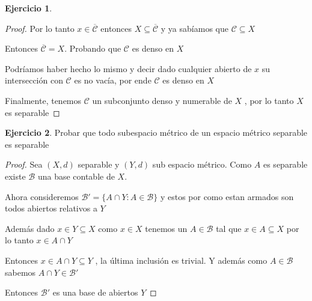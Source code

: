 \documentclass[11pt]{report}
\newcommand{\ol}{\overline}
\theoremstyle{definition}
\newtheorem{ej}{Ejercicio}
\begin{document}
\begin{ej}
\begin{proof}
		Por lo tanto $x \in \ol{\mathcal{C}}$ entonces $X \subseteq \ol{\mathcal{C}}$ y ya sabíamos que $\mathcal{C} \subseteq X$

		Entonces $\ol{\mathcal{C}} = X$. Probando que $\mathcal{C}$ es denso en $X$

		Podríamos haber hecho lo mismo y decir dado cualquier abierto de $x$ su intersección con $\mathcal{C}$ es no vacía, por ende $\mathcal{C}$ es denso en $X$

		Finalmente, tenemos $\mathcal{C}$ un subconjunto denso y numerable de $X$ , por lo tanto $X$ es separable
	\end{proof}
	
	
\end{ej}

\begin{ej}
Probar que todo subespacio métrico de un espacio métrico separable es separable
\begin{proof}
	Sea $(X,d)$ separable y $(Y,d)$ sub espacio métrico. Como $A$ es separable existe $\mathcal{B}$ una base contable de $X$.

	Ahora consideremos $\mathcal{B}' = \{A \cap Y : A \in \mathcal{B}\}$ y estos por como estan armados son todos abiertos relativos a $Y$ 

	Además dado $x \in Y \subseteq X$ como $x \in X$ tenemos un $A \in \mathcal{B}$ tal que $x \in A \subseteq X $ por lo tanto $x \in A \cap Y$

	Entonces $x \in A \cap Y \subseteq Y$ , la última inclusión es trivial. Y además como $A \in \mathcal{B}$ sabemos $A\cap Y \in \mathcal{B} '$

	Entonces $\mathcal{B}'$ es una base de abiertos $Y$

\end{proof}
\end{ej}
\end{document}
